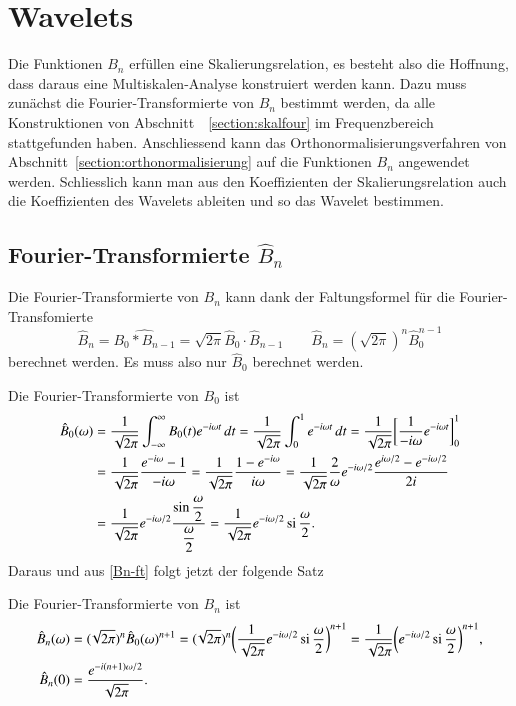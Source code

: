 %
%
%
\section{Wavelets
\label{section:spline-wavelets}}
Die Funktionen $B_n$ erfüllen eine Skalierungsrelation, es besteht also
die Hoffnung, dass daraus eine Multiskalen-Analyse konstruiert werden kann.
Dazu muss zunächst die Fourier-Transformierte von $B_n$ bestimmt werden,
da alle Konstruktionen von Abschnitt~ \ref{section:skalfour} im
Frequenzbereich stattgefunden haben.
Anschliessend kann das Orthonormalisierungsverfahren von
Abschnitt~\ref{section:orthonormalisierung} auf die Funktionen $B_n$
angewendet werden.
Schliesslich kann man aus den Koeffizienten der Skalierungsrelation
auch die Koeffizienten des Wavelets ableiten und so das Wavelet
bestimmen.

\subsection{Fourier-Transformierte $\hat{B}_n$
\label{subsection:spline-ft}}
Die Fourier-Transformierte von $B_n$ kann dank der Faltungsformel für die
Fourier-Transfomierte 
\begin{equation}
\hat{B}_n = \widehat{B_0 * B_{n-1}} = \sqrt{2\pi}\hat{B}_0 \cdot \hat{B}_{n-1}
\qquad
\hat{B}_n = (\!\sqrt{2\pi})^n \hat{B}_0^{n-1}
\label{Bn-ft}
\end{equation}
berechnet werden.
Es muss also nur $\hat{B}_0$ berechnet werden.

Die Fourier-Transformierte von $B_0$ ist
\begin{align*}
\hat{B}_0(\omega)
&=
\frac1{\sqrt{2\pi}}
\int_{-\infty}^{\infty}
B_0(t) e^{-i\omega t}\,dt
=
\frac1{\sqrt{2\pi}}
\int_0^1 e^{-i\omega t}\,dt
=
\frac1{\sqrt{2\pi}}
\biggl[
\frac{1}{-i\omega} 
e^{-i\omega t}
\biggr]_0^1
\\
&=
\frac1{\sqrt{2\pi}}
\frac{e^{-i\omega}-1}{-i\omega}
=
\frac1{\sqrt{2\pi}}
\frac{1-e^{-i\omega}}{i\omega}
=
\frac1{\sqrt{2\pi}}
\frac{2}{\omega}
e^{-i\omega/2}
\frac{e^{i\omega/2} - e^{-i\omega/2}}{2i}
\\
&=
\frac1{\sqrt{2\pi}}
e^{-i\omega/2}
\frac{\displaystyle\sin\frac{\omega}2}{\displaystyle\frac{\omega}2}
=
\frac1{\sqrt{2\pi}}
e^{-i\omega/2}
\si\frac{\omega}2.
\end{align*}
Daraus und aus \eqref{Bn-ft} folgt jetzt der folgende Satz

\begin{satz}
\label{satz:Bn-ft}
Die Fourier-Transformierte von $B_n$ ist
\begin{align*}
\hat{B}_n(\omega)
&=
(\!\sqrt{2\pi})^n
\hat{B}_0(\omega)^{n+1}
=
(\!\sqrt{2\pi})^n
\biggl(
\frac{1}{\sqrt{2\pi}}
e^{-i\omega/2} \si\frac{\omega}2
\biggr)^{n+1}
=
\frac{1}{\sqrt{2\pi}}
\biggl(
e^{-i\omega/2} \si\frac{\omega}2
\biggr)^{n+1},
\\
\hat{B}_n(0)
&=
\frac{e^{-i(n+1)\omega/2}}{\sqrt{2\pi}}
.
\end{align*}
\end{satz}

